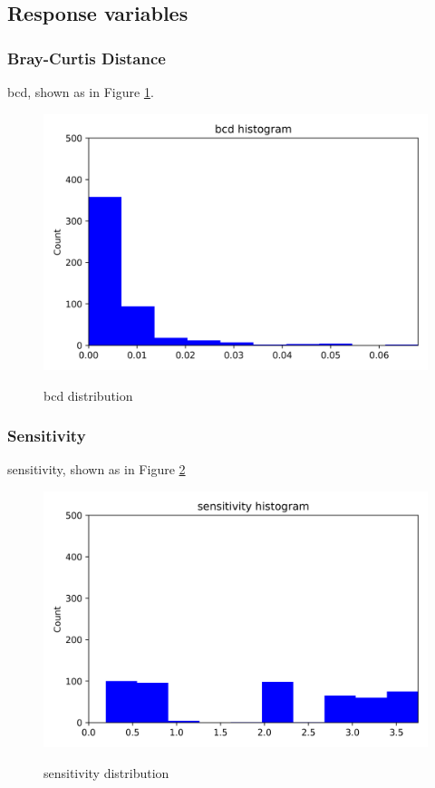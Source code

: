 \documentclass{article}
\begin{document}
\subsection{Response variables}



\subsubsection{Bray-Curtis Distance}

bcd, shown as in Figure \ref{bcd-communitylevel}.
\begin{figure}[htbp]
	\centering
	\includegraphics[width=\textwidth, keepaspectratio]{bcd-communitylevel.png}\\
	\caption{bcd distribution}
	\label{bcd-communitylevel}
\end{figure}

\subsubsection{Sensitivity}
sensitivity, shown as in Figure \ref{sensitivity-communitylevel}
\begin{figure}[htbp]
	\centering
	\includegraphics[width=\textwidth, keepaspectratio]{sensitivity-communitylevel.png}\\
	\caption{sensitivity distribution}
	\label{sensitivity-communitylevel}
\end{figure}
\end{document}
